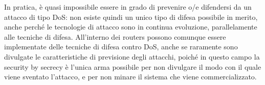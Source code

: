 In pratica, è quasi impossibile essere in grado di prevenire o/e difendersi
da un attacco di tipo DoS: non esiste quindi un unico tipo di difesa possibile
in merito, anche perché le tecnologie di attacco sono in continua evoluzione,
parallelamente alle tecniche di difesa. All'interno dei routers possono comunque
essere implementate delle tecniche di difesa contro DoS, anche se raramente 
sono divulgate le caratteristiche di previsione degli attacchi, poiché in questo
campo la security by secrecy è l'unica arma possibile per non divulgare il modo
con il quale viene sventato l'attacco, e per non minare il sistema che viene
commercializzato.
